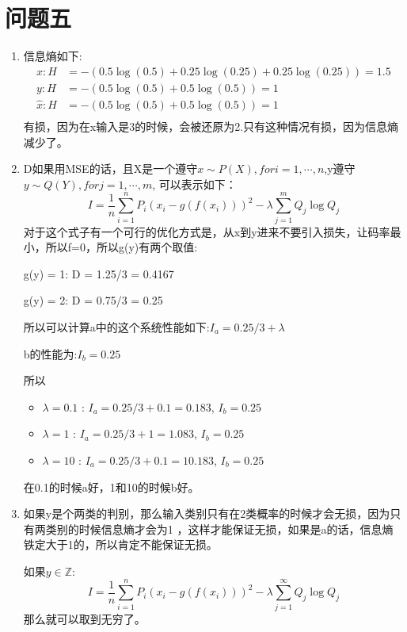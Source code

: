 \documentclass[answers]{exam}  %
\begin{document}
\section{问题五}
\begin{enumerate}[label=\alph*.] 
    \item 信息熵如下:
    \begin{align*}
        x: H &= -(0.5\log(0.5) + 0.25\log(0.25) + 0.25\log(0.25)) = 1.5\\
        y: H &= -(0.5\log(0.5) + 0.5\log(0.5)) = 1\\
        \hat{x}: H &= -(0.5\log(0.5) + 0.5\log(0.5)) = 1\\
    \end{align*}
    有损，因为在x输入是3的时候，会被还原为2.只有这种情况有损，因为信息熵减少了。

    \item D如果用MSE的话，且X是一个遵守$x\sim P(X),for i =1,\cdots, n$,y遵守$y\sim Q(Y),for j = 1,\cdots, m$, 可以表示如下：
    \begin{equation*}
        I = \frac{1}{n} \sum_{i=1}^{n} P_i\left(x_i - g(f(x_i))\right)^2 - \lambda \sum_{j=1}^{m}Q_j \log Q_j
    \end{equation*}
    对于这个式子有一个可行的优化方式是，从x到y进来不要引入损失，让码率最小，所以f=0，所以g(y)有两个取值:
    \par g(y) = 1: D = 1.25/3 = 0.4167
    \par g(y) = 2: D = 0.75/3 = 0.25
    \par 所以可以计算a中的这个系统性能如下:$I_a = 0.25/3 + \lambda$
    \par b的性能为:$I_b = 0.25$
    \par 所以
    \begin{itemize}
        \item $\lambda = 0.1$ : $I_a = 0.25/3 + 0.1 = 0.183$, $I_b = 0.25$
        \item $\lambda = 1$ : $I_a = 0.25/3 + 1 = 1.083$, $I_b = 0.25$
        \item $\lambda = 10$ : $I_a = 0.25/3 + 0.1 = 10.183$, $I_b = 0.25$
    \end{itemize}
    在0.1的时候a好，1和10的时候b好。
    \item 如果y是个两类的判别，那么输入类别只有在2类概率的时候才会无损，因为只有两类别的时候信息熵才会为1
    ，这样才能保证无损，如果是a的话，信息熵铁定大于1的，所以肯定不能保证无损。

    如果$y\in \mathbb{Z}$:
    \begin{equation*}
        I = \frac{1}{n} \sum_{i=1}^{n} P_i\left(x_i - g(f(x_i))\right)^2 - \lambda \sum_{j=1}^{\infty}Q_j \log Q_j
    \end{equation*}
    那么就可以取到无穷了。


\end{enumerate}
\end{document}
